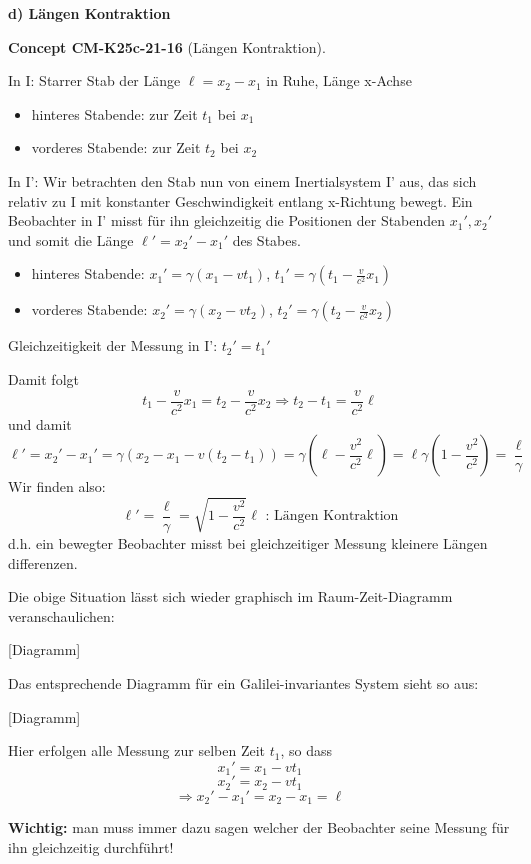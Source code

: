 \documentclass[10pt, letterpaper]{article}
\newcommand{\CustomHeading}[3]{%
  \par\medskip\noindent%
  \textbf{#1 #2} \textnormal{(#3)}.\enskip%
}
\newenvironment{CONC}[2]{\begin{unitbox}\CustomHeading{Concept}{#1}{#2}}{\end{unitbox}}
\begin{document}
\textbf{d) Längen Kontraktion}

\begin{CONC}{CM-K25c-21-16}{Längen Kontraktion}
In I: Starrer Stab der Länge $\ell = x_2-x_1$ in Ruhe, Länge x-Achse
\begin{itemize}
  \item hinteres Stabende: zur Zeit $t_1$ bei $x_1$

  \item vorderes Stabende: zur Zeit $t_2$ bei $x_2$
\end{itemize}



In I': Wir betrachten den Stab nun von einem Inertialsystem I' aus, das sich relativ zu I mit konstanter Geschwindigkeit entlang x-Richtung bewegt. Ein Beobachter in I' misst für ihn gleichzeitig die Positionen der Stabenden $x_1',x_2'$ und somit die Länge $\ell' = x_2'-x_1'$ des Stabes.

\begin{itemize}
  \item hinteres Stabende: $x_1' = \gamma(x_1-vt_1)$, $t_1' = \gamma(t_1-\frac{v}{c^2}x_1)$
  \item vorderes Stabende: $x_2' = \gamma(x_2-vt_2)$, $t_2' = \gamma(t_2-\frac{v}{c^2}x_2)$
\end{itemize}

Gleichzeitigkeit der Messung in I': $t_2'=t_1'$

Damit folgt
$$ t_1-\frac{v}{c^2}x_1 = t_2-\frac{v}{c^2}x_2 \Rightarrow t_2-t_1 = \frac{v}{c^2}\ell$$
und damit
$$ \ell' = x_2'-x_1' = \gamma(x_2-x_1-v(t_2-t_1)) = \gamma(\ell-\frac{v^2}{c^2}\ell) = \ell \gamma(1-\frac{v^2}{c^2}) = \frac{\ell}{\gamma}$$
Wir finden also:
$$\ell' = \frac{\ell}{\gamma} = \sqrt{1-\frac{v^2}{c^2}}\ell \text{ : Längen Kontraktion}$$
d.h. ein bewegter Beobachter misst bei gleichzeitiger Messung kleinere Längen differenzen.

Die obige Situation lässt sich wieder graphisch im Raum-Zeit-Diagramm veranschaulichen:

[Diagramm]

Das entsprechende Diagramm für ein Galilei-invariantes System sieht so aus:

[Diagramm]

Hier erfolgen alle Messung zur selben Zeit $t_1$, so dass
\[x_1'=x_1-vt_1\]
\[x_2'=x_2-vt_1\]
\[\Rightarrow x_2'-x_1'=x_2-x_1=\ell\]

\textbf{Wichtig:} man muss immer dazu sagen welcher der Beobachter seine Messung für ihn gleichzeitig durchführt!
\end{CONC}
\end{document}
